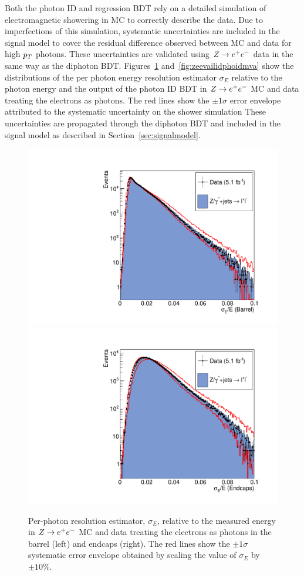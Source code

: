 Both the photon ID and regression BDT rely on a detailed simulation of electromagnetic showering  
in MC to correctly describe the data. Due to imperfections of this simulation, systematic
uncertainties are included in the signal model to cover the residual difference observed between MC and data
for high $p_{T}$ photons. 
These uncertainties are validated using $Z\rightarrow e^{+}e^{-}$ data in the same way as the diphoton BDT. 
Figures~\ref{fig:zeevalidsigmaE} and~\ref{fig:zeevailidphoidmva} show the distributions of the 
per photon energy resolution estimator $\sigma_{E}$ relative to the photon energy and the output of the 
photon ID BDT in $Z\rightarrow e^{+}e^{-}$ MC and data treating the electrons as photons. The red lines
show the $\pm 1\sigma$ error envelope attributed to the systematic uncertainty on the shower simulation 
These uncertainties are propagated through the diphoton BDT and included in the signal model as described in 
Section~\ref{sec:signalmodel}.

\begin{figure}
  \includegraphics[width=.48\textwidth]{hgg7TeV/zeeValidation/sigmaE_EB.pdf}
  \includegraphics[width=.48\textwidth]{hgg7TeV/zeeValidation/sigmaE_EE.pdf}
\caption{Per-photon resolution estimator, $\sigma_{E}$, relative to the measured energy in $Z\rightarrow e^{+}e^{-}$ 
MC and data 
treating the electrons as photons in the barrel (left) and endcaps (right). 
The red lines show the $\pm 1\sigma$ systematic error envelope obtained by scaling the value of 
$\sigma_{E}$ by $\pm 10\%$.}
\label{fig:zeevalidsigmaE}
\end{figure}

